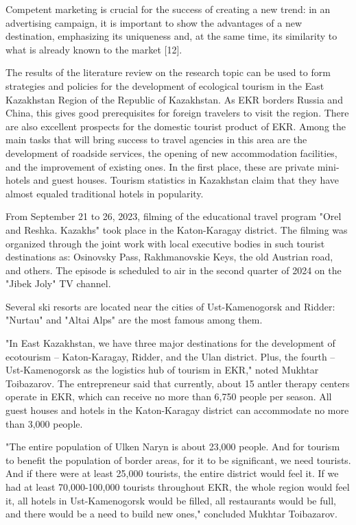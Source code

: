 Competent marketing is crucial for the success of creating a new trend:
in an advertising campaign, it is important to show the advantages of a
new destination, emphasizing its uniqueness and, at the same time, its
similarity to what is already known to the market {[}12{]}.

The results of the literature review on the research topic can be used
to form strategies and policies for the development of ecological
tourism in the East Kazakhstan Region of the Republic of Kazakhstan. As
EKR borders Russia and China, this gives good prerequisites for foreign
travelers to visit the region. There are also excellent prospects for
the domestic tourist product of EKR. Among the main tasks that will
bring success to travel agencies in this area are the development of
roadside services, the opening of new accommodation facilities, and the
improvement of existing ones. In the first place, these are private
mini-hotels and guest houses. Tourism statistics in Kazakhstan claim
that they have almost equaled traditional hotels in popularity.

From September 21 to 26, 2023, filming of the educational travel program
"Orel and Reshka. Kazakhs" took place in the Katon-Karagay district. The
filming was organized through the joint work with local executive bodies
in such tourist destinations as: Osinovsky Pass, Rakhmanovskie Keys, the
old Austrian road, and others. The episode is scheduled to air in the
second quarter of 2024 on the "Jibek Joly" TV channel.

Several ski resorts are located near the cities of Ust-Kamenogorsk and
Ridder: "Nurtau" and "Altai Alps" are the most famous among them.

"In East Kazakhstan, we have three major destinations for the
development of ecotourism -- Katon-Karagay, Ridder, and the Ulan
district. Plus, the fourth -- Ust-Kamenogorsk as the logistics hub of
tourism in EKR," noted Mukhtar Toibazarov. The entrepreneur said that
currently, about 15 antler therapy centers operate in EKR, which can
receive no more than 6,750 people per season. All guest houses and
hotels in the Katon-Karagay district can accommodate no more than 3,000
people.

"The entire population of Ulken Naryn is about 23,000 people. And for
tourism to benefit the population of border areas, for it to be
significant, we need tourists. And if there were at least 25,000
tourists, the entire district would feel it. If we had at least
70,000-100,000 tourists throughout EKR, the whole region would feel it,
all hotels in Ust-Kamenogorsk would be filled, all restaurants would be
full, and there would be a need to build new ones," concluded Mukhtar
Toibazarov.

